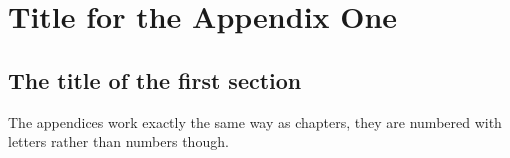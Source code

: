 \chapter{Title for the Appendix One}
\section{The title of the first section}

The appendices work exactly the same way as chapters, they are numbered with letters rather than numbers though.